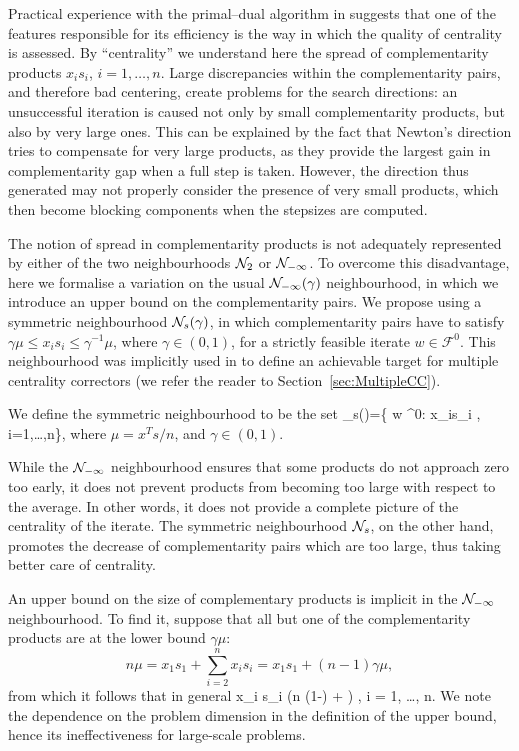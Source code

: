 Practical experience with the primal--dual algorithm in \HOPDM \cite{HOPDM}
suggests that one of the features responsible 
for its efficiency is the way in which the quality of centrality 
is assessed. By ``centrality'' we understand here the spread 
of complementarity products $x_i s_i$, $i = 1,\dots,n$.
Large discrepancies within the complementarity 
pairs, and therefore bad centering, create problems for the search 
directions: an unsuccessful iteration is caused not only by small
complementarity products, but also by very large ones.
%
 This can be explained by the fact that
Newton's direction tries to compensate for very 
large products, as they provide the largest gain in complementarity 
gap when a full step is taken. However, the direction thus generated 
may not properly consider the presence of very small products, 
which then become blocking components when the stepsizes are computed.

The notion of spread in complementarity products
is not adequately represented by either 
of the two neighbourhoods $\mathcal{N}_2$ or $\mathcal{N}_{-\infty}$.
To overcome this disadvantage, here we formalise a variation 
on the usual $\mathcal{N}_{-\infty}(\gamma)$ neighbourhood, 
in which we introduce an upper bound on the complementarity pairs. 
We propose using a symmetric neighbourhood $\mathcal{N}_s(\gamma)$,
in which complementarity pairs have to satisfy 
$\gamma \mu \leq x_i s_i \leq \gamma^{-1} \mu$, where $\gamma \in (0,1)$, 
for a strictly feasible iterate $w \in \mathcal{F}^0$.
This neighbourhood was implicitly used in \cite{Gondzio96}
to define an achievable target for multiple centrality correctors
(we refer the reader to Section~\ref{sec:MultipleCC}).

We define the symmetric neighbourhood to be the set
\be  \label{eq:SymmetricNeighbourhood}
  \Nhood_s(\gamma)=\{ w \in {}^0: 
  \gamma\mu\le x_is_i \le {}\mu, \; i=1,\ldots,n\},
\ee
where 
$\mu = x^Ts/n$, and $\gamma \in (0,1)$.

While the $\mathcal{N}_{-\infty}$ neighbourhood ensures that some 
products do not approach zero too early, it does not prevent products
from becoming too large with respect to the average.
In other words, it does not provide a complete 
picture of the centrality of the iterate. The symmetric 
neighbourhood $\mathcal{N}_s$, on the other hand, promotes 
the decrease of complementarity pairs which are too large, thus taking 
better care of centrality.

An upper bound on the size of complementary products
is implicit in the $\mathcal{N}_{-\infty}$ neighbourhood. To find it,
suppose that all but one of the complementarity products are at the lower bound
$\gamma\mu$:
\[
  n\mu = x_1s_1 + \sum_{i=2}^n x_is_i = x_1 s_1 + (n-1)\gamma\mu,
\]
from which it follows that in general
\be  \label{eq:UpperBoundN8hood}
  x_i s_i \le (n (1-\gamma) + \gamma) \mu, \quad i = 1, \ldots, n.
\ee
We note the dependence on the problem dimension in the definition of the
upper bound, hence its ineffectiveness for large-scale problems.

